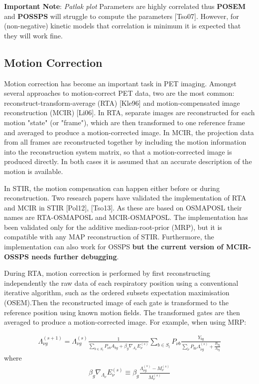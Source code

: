 \documentclass{article}
\begin{document}

\textbf{Important Note}:  \textit{Patlak plot} Parameters are highly correlated thus \textbf{POSEM} and \textbf{POSSPS} will struggle to compute the parameters [Tso07]. However, for (non-negative) kinetic models that correlation is minimum it is expected that they will work fine.


\subsection{
Motion Correction}
Motion correction has become an important task in PET imaging. Amongst several approaches to
motion-correct PET data, two are the most common: reconstruct-transform-average (RTA) [Kle96] and
motion-compensated image reconstruction (MCIR) [Li06]. In RTA, separate images are reconstructed for each
motion "state" (or "frame"), which are then transformed to one reference frame and averaged to produce a
motion-corrected image. In MCIR, the projection data from all frames are reconstructed together by
including the motion information into the reconstruction system matrix, so that a motion-corrected image
is produced directly. In both cases it is assumed that an accurate description of the motion is
available.

In STIR, the motion compensation can happen either before or during reconstruction. Two research papers
have validated the implementation of RTA and MCIR in STIR [Pol12], [Tso13]. As these are based on
OSMAPOSL their names are RTA-OSMAPOSL and MCIR-OSMAPOSL. The implementation has been validated only for
the additive median-root-prior (MRP), but it is compatible with any MAP reconstruction of STIR.
Furthermore, the implementation can also work for OSSPS \textbf{but the current version of MCIR-OSSPS
  needs further debugging}.

During RTA, motion correction is performed by first reconstructing independently the raw data of each
respiratory position using a conventional iterative algorithm, such as the ordered subsets expectation
maximisation (OSEM).Then the reconstructed image of each gate is transformed to the reference position
using known motion fields. The transformed gates are then averaged to produce a motion-corrected image.
For example, when using MRP:

\begin{equation}
\begin{array}{rrr}
\Lambda_{\nu g}^{(s+1)}=\Lambda_{\nu g}^{(s)}\frac{1}{ \sum\limits_{b\in S_{l}}P_{\nu b}A_{bg}+\beta_{g} \nabla_{\Lambda_{\nu}} E_{\nu}^{(s)}}\sum\limits_{b\in S_{l}}P_{\nu b}\frac{Y_{bg}}{\sum\limits_{\tilde{\nu}}P_{b\tilde{\nu}}\Lambda_{\tilde{\nu} g}^{(s)}+\frac{B_{bg}}{A_{bg}}}
\end{array}
\end{equation}
\noindent where
\begin{equation}
\begin{array}{rrr}
\beta_{g} \nabla_{\Lambda_{\nu}} E_{\nu}^{(s)} \equiv \beta_{g}\frac{\Lambda_{{\nu}g}^{(s)}-M_{{\nu}}^{(s)}}{M_{{\nu}}^{(s)}}
\end{array}
\end{equation}
\end{document}
